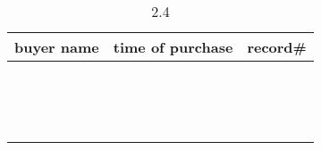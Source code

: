 \documentclass[]{article}
\begin{document}
		\begin{center}
			\begin{longtable}{|c|c|c|}
			\caption{2.4} \\ 
			\hline
			\hline
			buyer name & time of purchase & record\#  \\ 
			\hline
				\phantom{1} & &   \\
			\hline
				\phantom{1} &  & \\
			\hline
			\phantom{1} &  & \\
			\hline
				\phantom{1} &  & \\
			\hline
			\phantom{1} &  & \\
			\hline
				\phantom{1} &  &  \\
			\hline
			\phantom{1} &  & \\
			\hline
				\phantom{1} &  & \\
			\hline
			\phantom{1} &  & \\
			\hline
				\phantom{1} &  & \\
			\hline
				\phantom{1} &  &  \\
			\hline
			\phantom{1} &  & \\
			\hline
				\phantom{1} &  & \\
			\hline
			\phantom{1} &  & \\
			\hline
				\phantom{1} &  & \\
			\hline
			\hline
			\end{longtable}
		\end{center}
\end{document}
